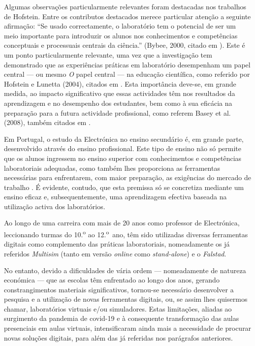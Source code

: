 Algumas observações particularmente relevantes foram destacadas nos trabalhos de Hofstein.
Entre os contributos destacados merece particular atenção a seguinte afirmação: ``Se usado correctamente, o laboratório tem o potencial de ser um meio importante para introduzir os alunos nos conhecimentos e competências conceptuais e processuais centrais da ciência.'' (Bybee, 2000, citado em \cite{Hofstein}). Este é um ponto particularmente relevante, uma vez que a investigação tem demonstrado que as experiências práticas em laboratório desempenham um papel central — ou mesmo \textit{O} papel central — na educação científica, como referido por Hofstein e Lunetta (2004), citados em \cite{BRINSON2015218}. Esta importância deve-se, em grande medida, ao impacto significativo que essas actividades têm nos resultados da aprendizagem e no desempenho dos estudantes, bem como à sua eficácia na preparação para a futura actividade profissional, como referem Basey et al. (2008), também citados em \cite{BRINSON2015218}.

Em Portugal, o estudo da Electrónica no ensino secundário é, em grande parte, desenvolvido através do ensino profissional. Este tipo de ensino não só permite que os alunos ingressem no ensino superior com conhecimentos e competências laboratoriais adequadas, como também lhes proporciona as ferramentas necessárias para enfrentarem, com maior preparação, as exigências do mercado de trabalho \cite{anqep}. É evidente, contudo, que esta premissa só se concretiza mediante um ensino eficaz e, subsequentemente, uma aprendizagem efectiva baseada na utilização activa dos laboratórios.

Ao longo de uma carreira com mais de 20 anos como professor de Electrónica, leccionando turmas do 10.\textsuperscript{o} ao 12.\textsuperscript{o}~ano, têm sido utilizadas diversas ferramentas digitais como complemento das práticas laboratoriais, nomeadamente os já referidos \textit{Multisim} (tanto em versão \textit{online} como \textit{stand-alone}) e o \textit{Falstad}.

No entanto, devido a dificuldades de vária ordem — nomeadamente de natureza económica — que as escolas têm enfrentado ao longo dos anos, gerando constrangimentos materiais significativos, tornou-se necessário desenvolver a pesquisa e a utilização de novas ferramentas digitais, ou, se assim lhes quisermos chamar, laboratórios virtuais e/ou simuladores. Estas limitações, aliadas ao surgimento da pandemia de \acrshort{covid-19} e à consequente transformação das aulas presenciais em aulas virtuais, intensificaram ainda mais a necessidade de procurar novas soluções digitais, para além das já referidas nos parágrafos anteriores.

